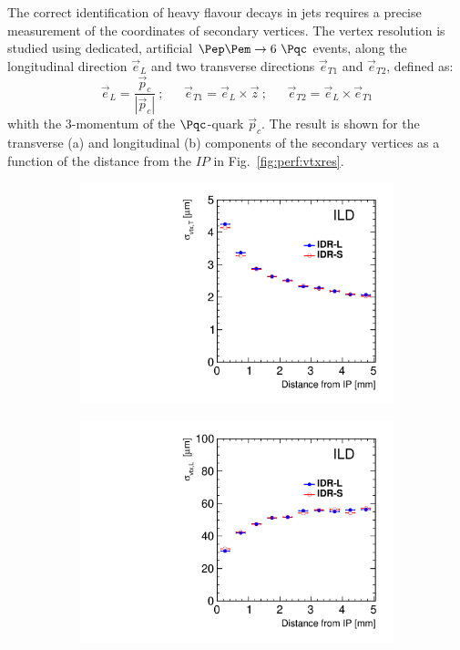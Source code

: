 The correct identification of heavy flavour decays in jets requires a precise measurement of the coordinates of secondary vertices.
The vertex resolution is studied using  dedicated, artificial $\Pep\Pem \rightarrow 6~\Pqc$ events, along the longitudinal direction $\vec{e}_L$
and two transverse directions $\vec{e}_{T1}$ and $\vec{e}_{T2}$, defined as:
\begin{equation}
\vec{e}_L = \frac{ \vec{p}_c }{|\vec{p}_c| }~; ~~~~~~~  \vec{e}_{T1} = \vec{e}_L \times \vec{z} ~; ~~~~~~~  \vec{e}_{T2} = \vec{e}_L \times \vec{e}_{T1}
\end{equation}
whith the 3-momentum of the $\Pqc$-quark $\vec{p}_c$.
The result is shown for the transverse (a) and longitudinal (b) components of the secondary vertices as a function of the distance from the $IP$
in Fig.~\ref{fig:perf:vtxres}.
\begin{figure}[htbp]
\begin{subfigure}{0.49\hsize}
 \includegraphics[width=\hsize]{Performance/fig/svtx_r_resol.pdf}
 \caption{ \label{fig:perf:svtx_r}}
 \end{subfigure}
\begin{subfigure}{0.49\hsize}
 \includegraphics[width=\hsize]{Performance/fig/svtx_z_resol.pdf}

\end{subfigure}
\end{figure}
